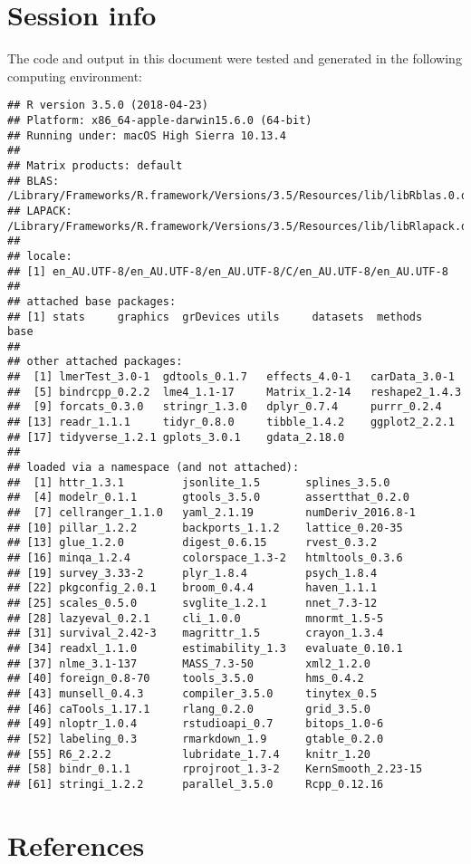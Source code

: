\documentclass[]{article}
\begin{document}
\section{Session info}\label{session-info}

The code and output in this document were tested and generated in the
following computing environment:

\begin{verbatim}
## R version 3.5.0 (2018-04-23)
## Platform: x86_64-apple-darwin15.6.0 (64-bit)
## Running under: macOS High Sierra 10.13.4
## 
## Matrix products: default
## BLAS: /Library/Frameworks/R.framework/Versions/3.5/Resources/lib/libRblas.0.dylib
## LAPACK: /Library/Frameworks/R.framework/Versions/3.5/Resources/lib/libRlapack.dylib
## 
## locale:
## [1] en_AU.UTF-8/en_AU.UTF-8/en_AU.UTF-8/C/en_AU.UTF-8/en_AU.UTF-8
## 
## attached base packages:
## [1] stats     graphics  grDevices utils     datasets  methods   base     
## 
## other attached packages:
##  [1] lmerTest_3.0-1  gdtools_0.1.7   effects_4.0-1   carData_3.0-1  
##  [5] bindrcpp_0.2.2  lme4_1.1-17     Matrix_1.2-14   reshape2_1.4.3 
##  [9] forcats_0.3.0   stringr_1.3.0   dplyr_0.7.4     purrr_0.2.4    
## [13] readr_1.1.1     tidyr_0.8.0     tibble_1.4.2    ggplot2_2.2.1  
## [17] tidyverse_1.2.1 gplots_3.0.1    gdata_2.18.0   
## 
## loaded via a namespace (and not attached):
##  [1] httr_1.3.1         jsonlite_1.5       splines_3.5.0     
##  [4] modelr_0.1.1       gtools_3.5.0       assertthat_0.2.0  
##  [7] cellranger_1.1.0   yaml_2.1.19        numDeriv_2016.8-1 
## [10] pillar_1.2.2       backports_1.1.2    lattice_0.20-35   
## [13] glue_1.2.0         digest_0.6.15      rvest_0.3.2       
## [16] minqa_1.2.4        colorspace_1.3-2   htmltools_0.3.6   
## [19] survey_3.33-2      plyr_1.8.4         psych_1.8.4       
## [22] pkgconfig_2.0.1    broom_0.4.4        haven_1.1.1       
## [25] scales_0.5.0       svglite_1.2.1      nnet_7.3-12       
## [28] lazyeval_0.2.1     cli_1.0.0          mnormt_1.5-5      
## [31] survival_2.42-3    magrittr_1.5       crayon_1.3.4      
## [34] readxl_1.1.0       estimability_1.3   evaluate_0.10.1   
## [37] nlme_3.1-137       MASS_7.3-50        xml2_1.2.0        
## [40] foreign_0.8-70     tools_3.5.0        hms_0.4.2         
## [43] munsell_0.4.3      compiler_3.5.0     tinytex_0.5       
## [46] caTools_1.17.1     rlang_0.2.0        grid_3.5.0        
## [49] nloptr_1.0.4       rstudioapi_0.7     bitops_1.0-6      
## [52] labeling_0.3       rmarkdown_1.9      gtable_0.2.0      
## [55] R6_2.2.2           lubridate_1.7.4    knitr_1.20        
## [58] bindr_0.1.1        rprojroot_1.3-2    KernSmooth_2.23-15
## [61] stringi_1.2.2      parallel_3.5.0     Rcpp_0.12.16
\end{verbatim}

\section{References}\label{references}
\end{document}
